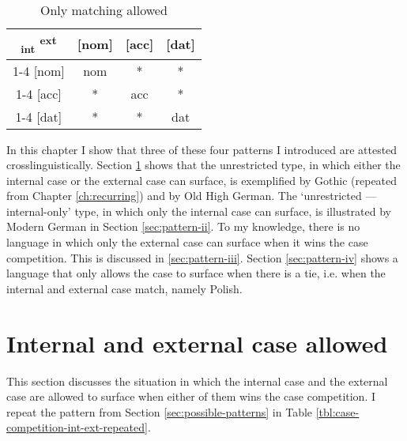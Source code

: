 \begin{table}[ht]
  \center
  \caption{Only matching allowed}
  \begin{tabular}{c|c|c|c}
    \toprule
    \textsubscript{\ac{int}} \textsuperscript{\ac{ext}}
           & [\ac{nom}]
           & [\ac{acc}]
           & [\ac{dat}]
           \\ \cmidrule{1-4}
       [\ac{nom}]
           & \ac{nom}
           & \cellcolor{DG}*
           & \cellcolor{DG}*
           \\ \cmidrule{1-4}
       [\ac{acc}]
           & \cellcolor{LG}*
           & \ac{acc}
           & \cellcolor{DG}*
           \\ \cmidrule{1-4}
       [\ac{dat}]
           & \cellcolor{LG}*
           & \cellcolor{LG}*
           & \ac{dat}
           \\
     \bottomrule
  \end{tabular}
    \label{tbl:case-competition-none}
\end{table}

In this chapter I show that three of these four patterns I introduced are attested crosslinguistically. Section \ref{sec:pattern-i} shows that the unrestricted type, in which either the internal case or the external case can surface, is exemplified by Gothic (repeated from Chapter \ref{ch:recurring}) and by Old High German. The `unrestricted --- internal-only' type, in which only the internal case can surface, is illustrated by Modern German in Section \ref{sec:pattern-ii}. To my knowledge, there is no language in which only the external case can surface when it wins the case competition. This is discussed in \ref{sec:pattern-iii}. Section \ref{sec:pattern-iv} shows a language that only allows the case to surface when there is a tie, i.e. when the internal and external case match, namely Polish.

\section{Internal and external case allowed}\label{sec:pattern-i}

This section discusses the situation in which the internal case and the external case are allowed to surface when either of them wins the case competition. I repeat the pattern from Section \ref{sec:possible-patterns} in Table \ref{tbl:case-competition-int-ext-repeated}.

